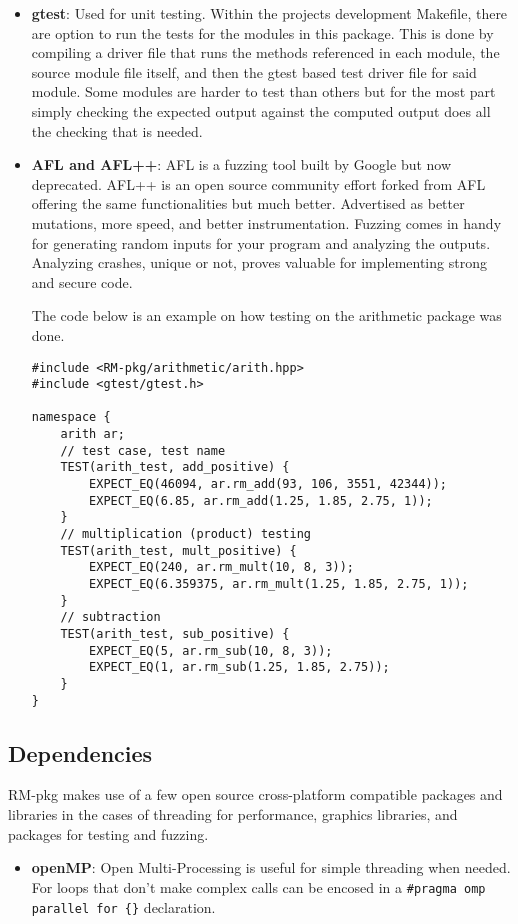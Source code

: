 \documentclass[12pt, letterpaper]{article}
\begin{document}
\begin{sloppypar}
\begin{flushleft}
\begin{itemize}
\item \textbf{gtest}: Used for unit testing. Within the projects development Makefile, 
there are option to run the tests for the modules in this package. This is done by compiling 
a driver file that runs the methods referenced in each module, the source module file itself, 
and then the gtest based test driver file for said module. Some modules are harder to test
than others but for the most part simply checking the expected output against the computed 
output does all the checking that is needed. 

\item \textbf{AFL and AFL++}: AFL is a fuzzing tool built by Google but now deprecated.
AFL++ is an open source community effort forked from AFL offering the same functionalities but 
much better. Advertised as better mutations, more speed, and better instrumentation. Fuzzing 
comes in handy for generating random inputs for your program and analyzing the outputs. 
Analyzing crashes, unique or not, proves valuable for implementing strong and secure code. 

The code below is an example on how testing on the arithmetic package was done.
\begin{lstlisting}
#include <RM-pkg/arithmetic/arith.hpp>
#include <gtest/gtest.h>

namespace {
    arith ar;
    // test case, test name
    TEST(arith_test, add_positive) {
        EXPECT_EQ(46094, ar.rm_add(93, 106, 3551, 42344));
        EXPECT_EQ(6.85, ar.rm_add(1.25, 1.85, 2.75, 1));
    }
    // multiplication (product) testing
    TEST(arith_test, mult_positive) {
        EXPECT_EQ(240, ar.rm_mult(10, 8, 3));
        EXPECT_EQ(6.359375, ar.rm_mult(1.25, 1.85, 2.75, 1));
    }
    // subtraction
    TEST(arith_test, sub_positive) {
        EXPECT_EQ(5, ar.rm_sub(10, 8, 3));
        EXPECT_EQ(1, ar.rm_sub(1.25, 1.85, 2.75));
    }
}
\end{lstlisting}

\end{itemize}

\subsection{Dependencies}
RM-pkg makes use of a few open source cross-platform compatible packages and libraries
in the cases of threading for performance, graphics libraries, and packages for testing
and fuzzing.
\begin{itemize}
\item \textbf{openMP}: Open Multi-Processing is useful for simple threading when needed.
For loops that don't make complex calls can be encosed in a 
\verb|#pragma omp parallel for {}| declaration.


\end{itemize}
\end{flushleft}
\end{sloppypar}
\end{document}
